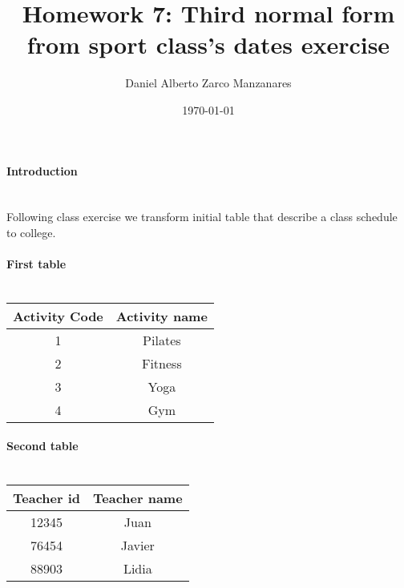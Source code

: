 \documentclass{article}
\begin{document}
\title{Homework 7: Third normal form from sport class's dates exercise}
\author{Daniel Alberto Zarco Manzanares}
\date{\today}
\maketitle
\paragraph{Introduction\\\\}
Following class exercise we transform initial table that describe a class schedule to college.
\paragraph{First table\\\\}
\begin{tabular}{|c|c|}
Activity Code & Activity name\\
\hline
1 & Pilates\\
2 & Fitness\\
3 & Yoga\\
4 & Gym\\
\end{tabular}
\paragraph{Second table\\\\}
\begin{tabular}{|c|c|}
Teacher id & Teacher name\\
\hline
12345 & Juan\\
76454 & Javier\\
88903 & Lidia\\
\end{tabular}
\end{document}
